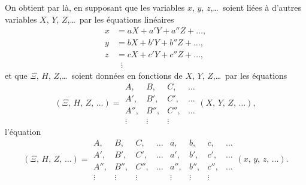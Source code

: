 \documentclass[11pt,a4paper]{book}
\begin{document}
On obtient par l\`a, en supposant que les variables $x$, $y$, $z$,\ldots\ soient
li\'ees \`a d'autres variables $X$, $Y$, $Z$,\ldots\ par les \'equations
lin\'eaires
\begin{align*}
x &= aX + a'Y + a''Z + \ldots, \\
y &= bX + b'Y + b''Z + \ldots, \\
z &= cX + c'Y + c''Z + \ldots, \\
& \;\;\vdots
\end{align*}
et que $\Xi$, $H$, $Z$,\ldots\ soient donn\'ees en fonctions de
$X$, $Y$, $Z$,\ldots\ par les \'equations
\[
(\Xi,\, H,\, Z,\, \ldots) =
\begin{array}{|cccc|}
A, & B, & C, & \ldots \\
A', & B', & C', & \ldots \\
A'', & B'', & C'', & \ldots \\
\vdots & \vdots & \vdots &
\end{array}
(X,\, Y,\, Z,\, \ldots),
\]
l'\'equation
\[
(\Xi,\, H,\, Z,\, \ldots) =
\begin{array}{|cccc|}
A, & B, & C, & \ldots \\
A', & B', & C', & \ldots \\
A'', & B'', & C'', & \ldots \\
\vdots & \vdots & \vdots &
\end{array}
\!
\begin{array}{|cccc|}
a, & b, & c, & \ldots \\
a', & b', & c', & \ldots \\
a'', & b'', & c'', & \ldots \\
\vdots & \vdots & \vdots &
\end{array}
(x,\, y,\, z,\, \ldots).
\]
\end{document}
